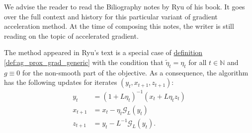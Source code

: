 \documentclass[12pt]{article}
\begin{document}
            \begin{remark}
                We advise the reader to read the Biliography notes by Ryu \cite[chapter 12]{ryu_large-scale_2022} of his book. 
                It goes over the full context and history for this particular variant of gradient acceleration method. 
                At the time of composing this notes, the writer is still reading on the topic of accelerated gradient.     
            \end{remark}

            \begin{definition}
            \label{def:ag_tri_pt_form_E}
                The method appeared in Ryu's text is a special case of 
                \hyperref[def:ag_prox_grad_generic]{definition \ref*{def:ag_prox_grad_generic}}
                with the condition that $\tilde \eta_t = \eta_t$ for all $t \in \mathbb N$ and $g \equiv 0$ for the non-smooth part of the objective. 
                As a consequence, the algorithm has the following updates for iterates $(y_t, x_{t + 1}, z_{t + 1})$: 
                \begin{align*}
                    y_t &= (1 + L\eta_t)^{-1}(x_t + L\eta_t z_t)
                    \\
                    x_{t + 1} &= x_t - \eta_t \mathcal G_L(y_t)
                    \\
                    z_{t + 1} &= y_t - L^{-1}\mathcal G_L(y_t).
                \end{align*}
            \end{definition}
\end{document}
